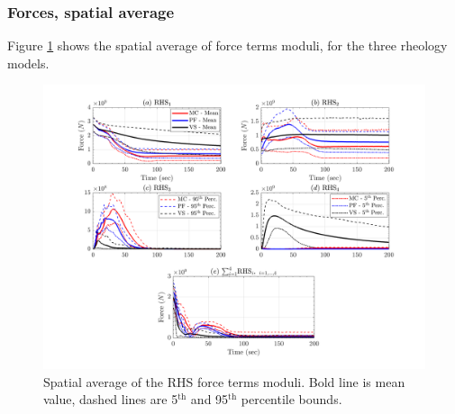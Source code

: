 \documentclass{article}
\begin{document}
\subsubsection{Forces, spatial average}
Figure \ref{fig:Colima-F-spatial} shows the spatial average of force terms moduli, for the three rheology models.
\begin{figure}[H]
        \centering
        \includegraphics[width=1\textwidth]{BAF_VolcanDeColima/AveragedMeasurments/ForcesColima.png}
        \caption{Spatial average of the RHS force terms moduli. Bold line is mean value, dashed lines are 5$^{\mathrm{th}}$ and 95$^{\mathrm{th}}$ percentile bounds.}
        \label{fig:Colima-F-spatial}
\end{figure}
\newpage
\end{document}
